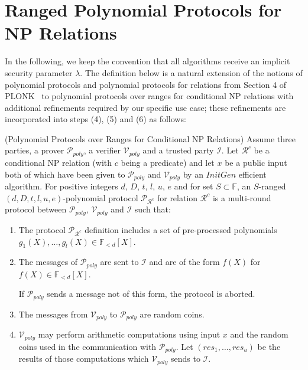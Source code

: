\section{Ranged Polynomial Protocols for NP Relations}
\label{supplementary_poly_protocols_appendix}

\noindent In the following, we keep the convention that all algorithms receive an implicit security parameter $\lambda$. The definition below 
is a natural extension of the notions of polynomial protocols and polynomial protocols for relations from Section 4 of PLONK~\cite{plonk} to 
polynomial protocols over ranges for conditional NP relations with additional refinements required by our specific use case; these refinements are 
incorporated into steps (4), (5) and (6) as follows: 

\begin{definition}(Polynomial Protocols over Ranges for Conditional NP Relations)
\label{def_ranged_poly_protocol}
Assume three parties, a prover $\mathcal{P}_{poly}$, a verifier $\mathcal{V}_{poly}$ and a trusted party $\mathcal{I}$. 
Let $\mathcal{R}^c$ be a conditional NP relation (with $c$ being a predicate) and let $x$ be a public 
input both of which have been given to $\mathcal{P}_{poly}$ and $\mathcal{V}_{poly}$ by an $\mathit{InitGen}$ efficient algorithm. 
For positive integers $d$, $D$, $t$, $l$, $u$, $e$ and for set 
$S \subset \mathbb{F}$, an $S$-ranged $(d, D, t, l, u, e)$-polynomial protocol $\mathscr{P}_{\mathcal{R}^c}$ for relation $\mathcal{R}^c$ is a multi-round 
protocol between $\mathcal{P}_{poly}$, $\mathcal{V}_{poly}$ and $\mathcal{I}$ such that:

\begin{enumerate}
\item The protocol $\mathscr{P}_{\mathcal{R}^c}$ definition includes a set of pre-processed polynomials $g_1(X), \ldots, g_l(X) \in \mathbb{F}_{<d}[X]$. 

\item The messages of $\mathcal{P}_{poly}$ are sent to $\mathcal{I}$ and are of the form $f(X)$ for $f(X) \in \mathbb{F}_{<d}[X]$. 

If $\mathcal{P}_{poly}$ sends a message not of this form, the protocol is aborted.
\item The messages from $\mathcal{V}_{poly}$ to $\mathcal{P}_{poly}$ are random coins.

\item
$\mathcal{V}_{poly}$ may perform arithmetic computations using input $x$ and the random coins used in the 
communication with $\mathcal{P}_{poly}$. Let $(\mathit{res_1}, \ldots, \mathit{res_u})$ be the results of those computations 
which $\mathcal{V}_{poly}$ sends to $\mathcal{I}$. 


\end{enumerate}
\end{definition}
